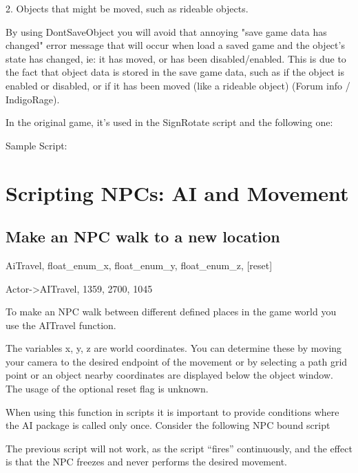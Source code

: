 2. Objects that might be moved, such as rideable objects.

By using DontSaveObject you will avoid that annoying "save game data has
changed" error message that will occur when load a saved game and the
object's state has changed, ie: it has moved, or has been
disabled/enabled. This is due to the fact that object data is stored in
the save game data, such as if the object is enabled or disabled, or if
it has been moved (like a rideable object) (Forum info / IndigoRage).

In the original game, it's used in the SignRotate script and the
following one:

Sample Script:



\hypertarget{scripting-npcs-ai-and-movement}{%
\section{\texorpdfstring{\hfill\break
Scripting NPCs: AI and
Movement}{ Scripting NPCs: AI and Movement}}\label{scripting-npcs-ai-and-movement}}

\hypertarget{make-an-npc-walk-to-a-new-location}{%
\subsection{Make an NPC walk to a new
location}\label{make-an-npc-walk-to-a-new-location}}

AiTravel, float\_enum\_x, float\_enum\_y, float\_enum\_z, {[}reset{]}

Actor-\textgreater AITravel, 1359, 2700, 1045

To make an NPC walk between different defined places in the game world
you use the AITravel function.

The variables x, y, z are world coordinates. You can determine these by
moving your camera to the desired endpoint of the movement or by
selecting a path grid point or an object nearby coordinates are
displayed below the object window. The usage of the optional reset flag
is unknown.

When using this function in scripts it is important to provide
conditions where the AI package is called only once. Consider the
following NPC bound script



The previous script will not work, as the script ``fires'' continuously,
and the effect is that the NPC freezes and never performs the desired
movement.

